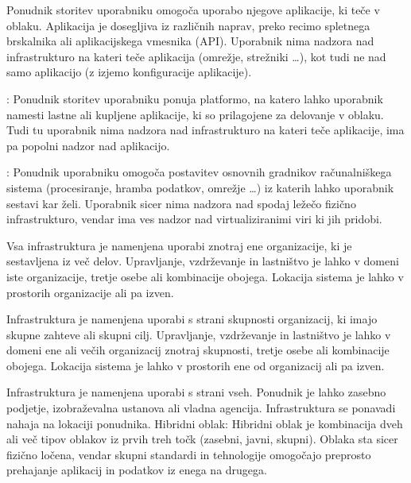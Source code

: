 \documentclass[12pt,a4paper,openany]{book}
\begin{document}
\begin{description}[style=nextline]
	\item[\gls{SaaS}] Ponudnik storitev uporabniku omogoča uporabo njegove aplikacije, ki teče v oblaku. Aplikacija je dosegljiva iz različnih naprav, preko recimo spletnega brskalnika ali aplikacijskega vmesnika (\gls{API}). Uporabnik nima nadzora nad infrastrukturo na kateri teče aplikacija (omrežje, strežniki …), kot tudi ne nad samo aplikacijo (z izjemo konfiguracije aplikacije).

	\item[\gls{PaaS}]: Ponudnik storitev uporabniku ponuja platformo, na katero lahko uporabnik namesti lastne ali kupljene aplikacije, ki so prilagojene za delovanje v oblaku. Tudi tu uporabnik nima nadzora nad infrastrukturo na kateri teče aplikacije, ima pa popolni nadzor nad aplikacijo.

	\item[\gls{IaaS}]: Ponudnik uporabniku omogoča postavitev osnovnih gradnikov računalniškega sistema (procesiranje, hramba podatkov, omrežje …) iz katerih lahko uporabnik sestavi kar želi. Uporabnik sicer nima nadzora nad spodaj ležečo fizično infrastrukturo, vendar ima ves nadzor nad virtualiziranimi viri ki jih pridobi.
\end{description}

\begin{description}[style=nextline]
	\item[Zasebni oblak] Vsa infrastruktura je namenjena uporabi znotraj ene organizacije, ki je sestavljena iz več delov. Upravljanje, vzdrževanje in lastništvo je lahko v domeni iste organizacije, tretje osebe ali kombinacije obojega. Lokacija sistema je lahko v prostorih organizacije ali pa izven.

	\item[Skupni oblak] Infrastruktura je namenjena uporabi s strani skupnosti organizacij, ki imajo skupne zahteve ali skupni cilj. Upravljanje, vzdrževanje in lastništvo je lahko v domeni ene ali večih organizacij znotraj skupnosti, tretje osebe ali kombinacije obojega. Lokacija sistema je lahko v prostorih ene od organizacij ali pa izven.

	\item[Javni oblak] Infrastruktura je namenjena uporabi s strani vseh. Ponudnik je lahko zasebno podjetje, izobraževalna ustanova ali vladna agencija. Infrastruktura se ponavadi nahaja na lokaciji ponudnika.
	Hibridni oblak: Hibridni oblak je kombinacija dveh ali več tipov oblakov iz prvih treh točk (zasebni, javni, skupni). Oblaka sta sicer fizično ločena, vendar skupni standardi in tehnologije omogočajo preprosto prehajanje aplikacij in podatkov iz enega na drugega.
\end{description}
\end{document}
